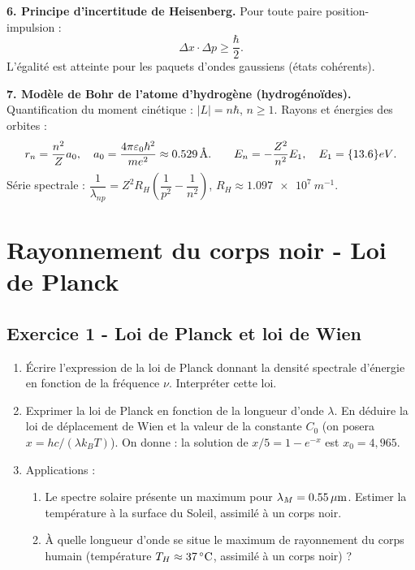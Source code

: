 \documentclass[12pt,a4paper]{article}
\begin{document}
\begin{boiteresume}
\textbf{6. Principe d'incertitude de Heisenberg.}
Pour toute paire position-impulsion :
\[
  \Delta x \cdot \Delta p \geq \frac{\hbar}{2}.
\]
L'égalité est atteinte pour les paquets d'ondes gaussiens (états cohérents).

\textbf{7. Modèle de Bohr de l'atome d'hydrogène (hydrogénoïdes).}
Quantification du moment cinétique : $|L| = n\hbar$, $n\geq 1$. Rayons et énergies des orbites :
\[
  r_n = \frac{n^2}{Z}a_0, \quad a_0 = \frac{4\pi\varepsilon_0\hbar^2}{me^2} \approx \num{0.529}\,\text{\AA}.
  \qquad E_n = -\frac{Z^2}{n^2}E_1, \quad E_1 = \qty{13.6}{eV}.
\]
Série spectrale : $\dfrac{1}{\lambda_{np}} = Z^2 R_H\!\left(\dfrac{1}{p^2}-\dfrac{1}{n^2}\right)$,
$R_H \approx \qty{1.097e7}{m^{-1}}$.

\end{boiteresume}

\newpage
\section{Rayonnement du corps noir - Loi de Planck}

\subsection*{Exercice 1 - Loi de Planck et loi de Wien \niveau{\moyen}}

\begin{boiteexercice}
\begin{enumerate}
  \item Écrire l'expression de la loi de Planck donnant la densité spectrale d'énergie en fonction
    de la fréquence $\nu$. Interpréter cette loi.
  \item Exprimer la loi de Planck en fonction de la longueur d'onde $\lambda$. En déduire la loi de
    déplacement de Wien et la valeur de la constante $C_0$ (on posera $x = hc/(\lambda k_BT)$).
    On donne : la solution de $x/5 = 1-e^{-x}$ est $x_0 = 4{,}965$.
  \item Applications :
    \begin{enumerate}
      \item Le spectre solaire présente un maximum pour $\lambda_M = \num{0.55}\,\mu\text{m}$. Estimer
        la température à la surface du Soleil, assimilé à un corps noir.
      \item À quelle longueur d'onde se situe le maximum de rayonnement du corps humain
        (température $T_H \approx \num{37}\,{}^\circ\text{C}$, assimilé à un corps noir) ?
    \end{enumerate}
\end{enumerate}
\end{boiteexercice}
\end{document}
